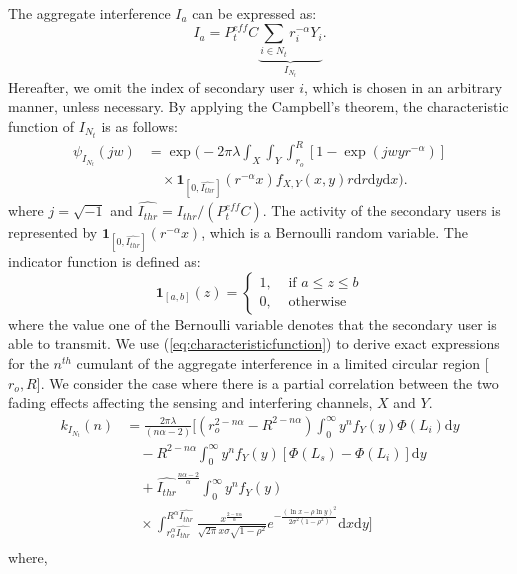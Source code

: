 \documentclass[12pt,submission,journal,onecolumn]{IEEEtran}
\begin{document}
The aggregate interference $I_{a}$ can be expressed as:
\begin{equation}
\label{eq:Ia2}
I_{a}= P_{t}^{eff} C \underbrace{\sum_{i\in N_{t}} r_{i}^{-\alpha} Y_{i}}_{I_{N_{t}}}.
\end{equation}
Hereafter, we omit the index of secondary user $i$, which is chosen in an arbitrary manner, unless necessary. By applying the Campbell's theorem, the characteristic function of $I_{N_{t}}$ is as follows:
\begin{equation}
\label{eq:characteristicfunction}
\begin{split}
\psi_{I_{N_{t}}}(jw) & = \exp \biggl (-2 \pi \lambda \int_{X} \int_{Y} \int_{r_{o}}^{R} [1-\exp(jwyr^{-\alpha})] \\
& \quad \times \textbf{1}_{[0,\hat{I_{thr}}]}(r^{-\alpha}x) f_{X,Y}(x,y) r\mathrm{d}r \mathrm{d}y \mathrm{d}x \biggl).
\end{split}
\end{equation}
where $j=\sqrt{-1}$ and $\hat{I_{thr}} = I_{thr}/(P_{t}^{eff}C)$. The activity of the secondary users is represented by $\textbf{1}_{[0,\hat{I_{thr}}]}(r^{-\alpha}x)$, which is a Bernoulli random variable. The indicator function is defined as:
\begin{equation}
\label{eq:indicator}
\textbf{1}_{[a,b]}(z)= \left\{ \begin{array} {rl} 1, &\mbox{ if $a\leq z\leq b$}\\
0, &\mbox{ otherwise}
       \end{array} \right.
\end{equation}
where the value one of the Bernoulli variable denotes that the secondary user is able to transmit. We use (\ref{eq:characteristicfunction}) to derive exact expressions for the $n^{th}$ cumulant of the aggregate interference in a limited circular region [$r_{o}, R$]. We consider the case where there is a partial correlation between the two fading effects affecting the sensing and interfering channels, $X$ and $Y$.\begin{equation}
\label{eq:cumulatlog}
\begin{split}
k_{I_{N_{t}}} (n) & = \frac{2 \pi \lambda}{(n\alpha-2)} \biggl[(r_{o}^{2-n\alpha}-R^{2-n\alpha}) \int_0^\infty y^n f_{Y}(y) \Phi(L_{i})\mathrm{d}y\\
& \quad - R^{2-n\alpha} \int_0^\infty y^n f_{Y}(y)[\Phi(L_{s})-\Phi(L_{i})]\mathrm{d}y\\
& \quad +  \hat{I_{thr}}^{\frac{n\alpha-2}{\alpha}} \int_0^\infty y^n f_{Y}(y) \\
& \quad \times \int_{r_{o}^\alpha  \hat{I_{thr}}}^{R^\alpha  \hat{I_{thr}}} \frac{x^{\frac{2-n\alpha}{\alpha}}}{\sqrt{2\pi} x \sigma \sqrt{1-\rho^2}} e^{-\frac{(\ln x-\rho\ln y)^2}{2\sigma^2(1-\rho^2)}} \mathrm{d}x \mathrm{d}y\biggl]\\
\end{split}
\end{equation}
where,
\end{document}
